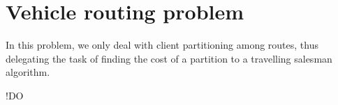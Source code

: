 \section{Vehicle routing problem} \label{algorithm-vrp}
In this problem, we only deal with client partitioning among routes, thus delegating the task of finding the cost of a partition to a travelling salesman algorithm.\par
!DO



